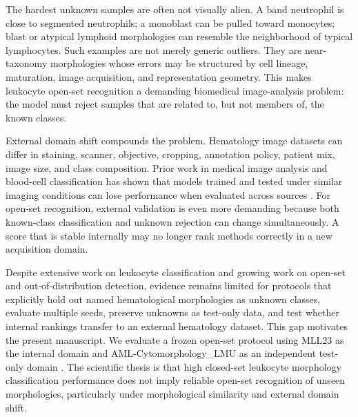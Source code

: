The hardest unknown samples are often not visually alien. A band neutrophil is close to segmented neutrophils; a monoblast can be pulled toward monocytes; blast or atypical lymphoid morphologies can resemble the neighborhood of typical lymphocytes. Such examples are not merely generic outliers. They are near-taxonomy morphologies whose errors may be structured by cell lineage, maturation, image acquisition, and representation geometry. This makes leukocyte open-set recognition a demanding biomedical image-analysis problem: the model must reject samples that are related to, but not members of, the known classes.

External domain shift compounds the problem. Hematology image datasets can differ in staining, scanner, objective, cropping, annotation policy, patient mix, image size, and class composition. Prior work in medical image analysis and blood-cell classification has shown that models trained and tested under similar imaging conditions can lose performance when evaluated across sources \cite{guan2022_domain_adaptation_medical,litjens2017_medical_ai_survey,salehi2022_cross_domain,sadafi2024_continual_wbc,tsutsui2023_wbc_domain_shift}. For open-set recognition, external validation is even more demanding because both known-class classification and unknown rejection can change simultaneously. A score that is stable internally may no longer rank methods correctly in a new acquisition domain.

Despite extensive work on leukocyte classification and growing work on open-set and out-of-distribution detection, evidence remains limited for protocols that explicitly hold out named hematological morphologies as unknown classes, evaluate multiple seeds, preserve unknowns as test-only data, and test whether internal rankings transfer to an external hematology dataset. This gap motivates the present manuscript. We evaluate a frozen open-set protocol using MLL23 as the internal domain and AML-Cytomorphology\_LMU as an independent test-only domain \cite{mll23_nature_2025,mll23_zenodo_2024,aml_lmu_tcia_2019}. The scientific thesis is that high closed-set leukocyte morphology classification performance does not imply reliable open-set recognition of unseen morphologies, particularly under morphological similarity and external domain shift.

